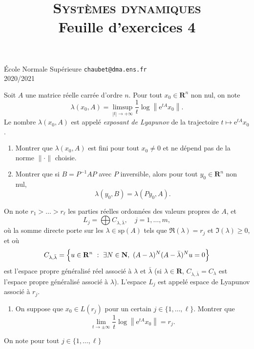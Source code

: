 \documentclass[a4paper,10pt,openany]{article}
\title{\textsc{Syst\`emes dynamiques} \\ Feuille d'exercices 4}
\date{}
\author{}
\theoremstyle{plain}
\theoremstyle{definition}
\newcommand{\e}{\mathrm{e}}
\newcommand{\R}{\mathbf{R}}
\newcommand{\N}{\mathbf{N}}
\begin{document}
{\noindent \'Ecole Normale Sup\'erieure  \hfill \texttt{chaubet@dma.ens.fr} } \\
{2020/2021 \hfill }

{\let\newpage\relax\maketitle}
\maketitle

 \vspace{1.5mm} 

\noindent Soit $A$ une matrice r\'eelle carr\'ee d'ordre $n$. Pour tout $x_0 \in \R^n$ non nul, on note
$$
\lambda(x_0, A) = \limsup_{|t| \to + \infty} \frac{1}{t} \log \left\|\e^{tA}x_0\right\|.
$$
Le nombre $\lambda(x_0,A)$ est appel\'e \textit{exposant de Lyapunov} de la trajectoire $\displaystyle{t \mapsto \e^{tA}x_0}$.
\begin{enumerate}
\item Montrer que $\lambda(x_0,A)$ est fini pour tout $x_0 \neq 0$ et ne d\'epend pas de la norme $\|\cdot\|$ choisie.
\item Montrer que si $B = P^{-1}AP$ avec $P$ inversible, alors pour tout $y_0 \in \R^n$ non nul,
$$
\lambda(y_0,B) = \lambda(Py_0,A).
$$
\end{enumerate}
On note $r_1 > \dots > r_\ell$ les parties r\'eelles ordonn\'ees des valeurs propres de $A$, et
$$
L_j = \bigoplus C_{\lambda, \bar{\lambda}}, \quad j=1,\dots,m,
$$
o\`u la somme directe porte sur les $\lambda \in \mathrm{sp}(A)$ tels que $\Re(\lambda) = r_j$ et $\Im(\lambda) \geq 0$, et o\`u 
$$C_{\lambda,\bar{\lambda}} = \Bigl\{u \in \R^n~:~ \exists N \in \N,~ (A-\lambda)^N(A-\bar{\lambda})^{N}u = 0 \Bigr\}$$
est l'espace propre g\'en\'eralis\'e r\'eel associ\'e \`a $\lambda$ et $\bar{\lambda}$ (si $\lambda \in \R$, $C_{\lambda, \bar{\lambda}} = C_\lambda$ est l'espace propre g\'en\'eralis\'e associ\'e \`a $\lambda$). L'espace $L_j$ est appel\'e espace de Lyapunov associ\'e \`a $r_j$.
\begin{enumerate}[resume]
\item On suppose que $x_0 \in L(r_j)$ pour un certain $j \in \{1, \dots, \ell\}$. Montrer que 
$$
\lim_{t\to \pm \infty} \frac{1}{t} \log \left\| \e^{tA}x_0 \right\| = r_j.
$$
\end{enumerate}
On note pour tout $j \in \{1, \dots, \ell\}$
\end{document}
